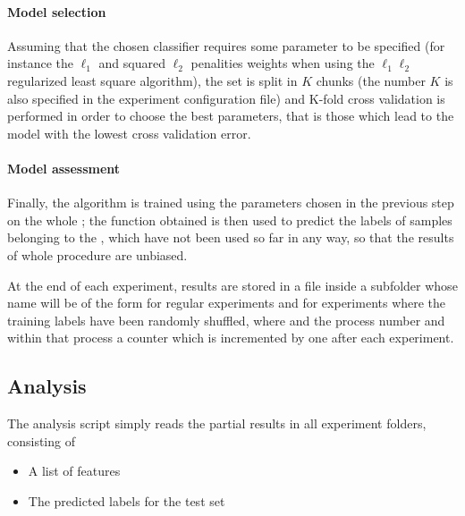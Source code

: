 \documentclass[letterpaper,10pt,english]{sphinxmanual}
\begin{document}
\paragraph{Model selection}
\label{\detokenize{framework:model-selection}}
Assuming that the chosen classifier requires some parameter to be specified (for instance the \(\ell_1\) and squared \(\ell_2\) penalities weights when using the \(\ell_1 \ell_2\) regularized least square algorithm), the  set is split in \(K\) chunks (the number \(K\) is also specified in the experiment configuration file) and K-fold cross validation is performed in order to choose the best parameters, that is those which lead to the model with the lowest cross validation error.


\paragraph{Model assessment}
\label{\detokenize{framework:model-assessment}}
Finally, the algorithm is trained using the parameters chosen in the previous step on the whole ; the function obtained is then used to predict the labels of samples belonging to the , which have not been used so far in any way, so that the results of whole procedure are unbiased.

At the end of each experiment, results are stored in a  file inside a subfolder whose name will be of the form  for regular experiments and  for experiments where the training labels have been randomly shuffled, where  and  the process number and within that process a counter which is incremented by one after each experiment.


\subsection{Analysis}
\label{\detokenize{framework:id2}}\label{\detokenize{framework:analysis}}
The analysis script simply reads the partial results in all experiment folders, consisting of
\begin{itemize}
\item {} 
A list of features

\item {} 
The predicted labels for the test set

\end{itemize}
\end{document}
